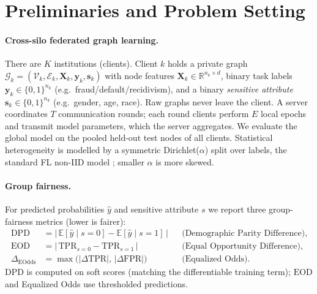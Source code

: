 \documentclass[pdflatex,sn-mathphys-num]{sn-jnl}
\theoremstyle{thmstyleone}%
\theoremstyle{thmstyletwo}%
\theoremstyle{thmstylethree}%
\newcommand{\dpd}{\mathrm{DPD}}
\newcommand{\eod}{\mathrm{EOD}}
\newcommand{\R}{\mathbb{R}}
\newcommand{\E}{\mathbb{E}}
\begin{document}
\section{Preliminaries and Problem Setting}
\label{sec:prelim}

\paragraph{Cross-silo federated graph learning.}
There are $K$ institutions (clients). Client $k$ holds a private graph
$\mathcal{G}_k=(\mathcal{V}_k,\mathcal{E}_k,\mathbf{X}_k,\mathbf{y}_k,\mathbf{s}_k)$
with node features $\mathbf{X}_k\in\R^{n_k\times d}$, binary task labels
$\mathbf{y}_k\in\{0,1\}^{n_k}$ (e.g.\ fraud/default/recidivism), and a binary
\emph{sensitive attribute} $\mathbf{s}_k\in\{0,1\}^{n_k}$ (e.g.\ gender, age,
race). Raw graphs never leave the client. A server coordinates $T$
communication rounds; each round clients perform $E$ local epochs and transmit
model parameters, which the server aggregates. We evaluate the global model on
the pooled held-out test nodes of all clients. Statistical heterogeneity is
modelled by a symmetric Dirichlet($\alpha$) split over labels, the standard FL
non-IID model \cite{hsu2019measuring}; smaller $\alpha$ is more skewed.

\paragraph{Group fairness.}
For predicted probabilities $\hat{y}$ and sensitive attribute $s$ we report
three group-fairness metrics (lower is fairer):
\begin{align}
\dpd &= \big|\,\E[\hat{y}\mid s{=}0]-\E[\hat{y}\mid s{=}1]\,\big|
        &&\text{(Demographic Parity Difference)},\\
\eod &= \big|\,\mathrm{TPR}_{s=0}-\mathrm{TPR}_{s=1}\,\big|
        &&\text{(Equal Opportunity Difference)},\\
\Delta_{\mathrm{EOdds}} &= \max\big(|\Delta\mathrm{TPR}|,\,|\Delta\mathrm{FPR}|\big)
        &&\text{(Equalized Odds)} .
\end{align}
$\dpd$ is computed on soft scores (matching the differentiable training term);
$\eod$ and Equalized Odds use thresholded predictions.
\end{document}
